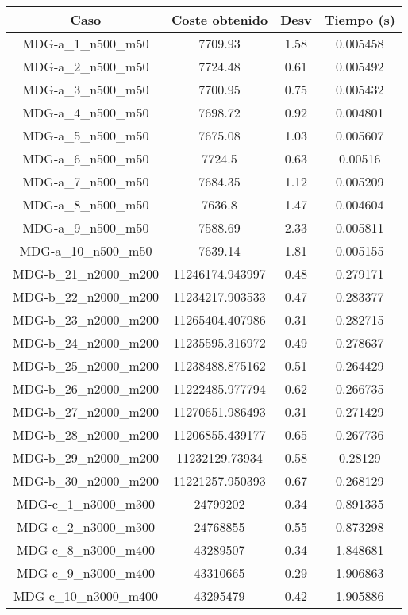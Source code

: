 \documentclass{article}
\begin{document}
\begin{table}[H]
	\centering
	\begin{tabular}{|cccc|}
		\hline
		Caso & Coste obtenido & Desv & Tiempo (s)\\ \hline
		MDG-a\_1\_n500\_m50 & 7709.93 & 1.58 & 0.005458\\
		MDG-a\_2\_n500\_m50 & 7724.48 & 0.61 & 0.005492\\
		MDG-a\_3\_n500\_m50 & 7700.95 & 0.75 & 0.005432\\
		MDG-a\_4\_n500\_m50 & 7698.72 & 0.92 & 0.004801\\
		MDG-a\_5\_n500\_m50 & 7675.08 & 1.03 & 0.005607\\
		MDG-a\_6\_n500\_m50 & 7724.5 & 0.63 & 0.00516\\
		MDG-a\_7\_n500\_m50 & 7684.35 & 1.12 & 0.005209\\
		MDG-a\_8\_n500\_m50 & 7636.8 & 1.47 & 0.004604\\
		MDG-a\_9\_n500\_m50 & 7588.69 & 2.33 & 0.005811\\
		MDG-a\_10\_n500\_m50 & 7639.14 & 1.81 & 0.005155\\
		MDG-b\_21\_n2000\_m200 & 11246174.943997 & 0.48 & 0.279171\\
		MDG-b\_22\_n2000\_m200 & 11234217.903533 & 0.47 & 0.283377\\
		MDG-b\_23\_n2000\_m200 & 11265404.407986 & 0.31 & 0.282715\\
		MDG-b\_24\_n2000\_m200 & 11235595.316972 & 0.49 & 0.278637\\
		MDG-b\_25\_n2000\_m200 & 11238488.875162 & 0.51 & 0.264429\\
		MDG-b\_26\_n2000\_m200 & 11222485.977794 & 0.62 & 0.266735\\
		MDG-b\_27\_n2000\_m200 & 11270651.986493 & 0.31 & 0.271429\\
		MDG-b\_28\_n2000\_m200 & 11206855.439177 & 0.65 & 0.267736\\
		MDG-b\_29\_n2000\_m200 & 11232129.73934 & 0.58 & 0.28129\\
		MDG-b\_30\_n2000\_m200 & 11221257.950393 & 0.67 & 0.268129\\
		MDG-c\_1\_n3000\_m300 & 24799202 & 0.34 & 0.891335\\
		MDG-c\_2\_n3000\_m300 & 24768855 & 0.55 & 0.873298\\
		MDG-c\_8\_n3000\_m400 & 43289507 & 0.34 & 1.848681\\
		MDG-c\_9\_n3000\_m400 & 43310665 & 0.29 & 1.906863\\
		MDG-c\_10\_n3000\_m400 & 43295479 & 0.42 & 1.905886\\

\end{tabular}
\end{table}
\end{document}
